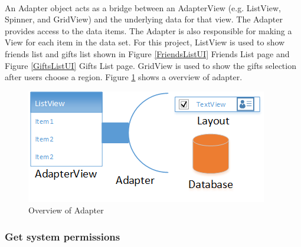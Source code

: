 \paragraph{}
An Adapter object acts as a bridge between an AdapterView (e.g. ListView, Spinner, and GridView) and the underlying data for that view. The Adapter provides access to the data items. The Adapter is also responsible for making a View for each item in the data set. For this project, ListView is used to show friends list and gifts list shown in Figure \ref{FriendsListUI} Friends List page and Figure \ref{GiftsListUI} Gifts List page. GridView is used to show the gifts selection after users choose a region. Figure \ref{AdapterOverview} shows a overview of adapter.
\begin{figure}[htb]
\centering
\includegraphics[width=.7\textwidth]{section04/assets/AdapterOverview.png}
\caption[Short Caption]{\label{AdapterOverview}Overview of Adapter}
\end{figure}

\subsubsection{Get system permissions}
\label{subsubsec:GetSystemPermissions}
